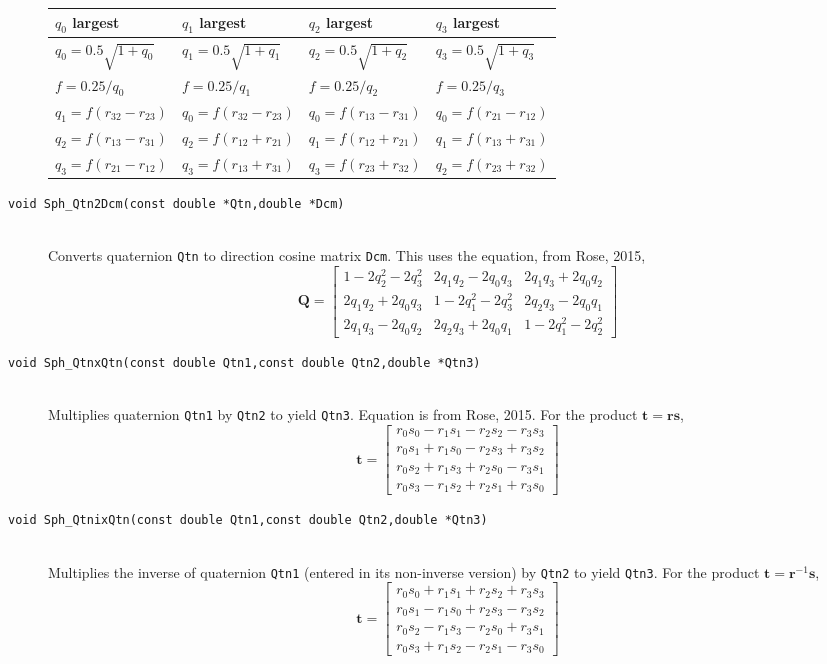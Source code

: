\documentclass[11pt]{article}
\newcommand {\ttt} {\texttt}
\begin{document}
\begin{description}
\begin{tabular}{llll}
$q_0$ largest & $q_1$ largest & $q_2$ largest & $q_3$ largest \\
\hline
$q_0 = 0.5 \sqrt{1+q_0}$ & $q_1 = 0.5 \sqrt{1+q_1}$ & $q_2 = 0.5 \sqrt{1+q_2}$ & $q_3 = 0.5 \sqrt{1+q_3}$ \\
$f = 0.25/q_0$ & $f = 0.25/q_1$ & $f = 0.25/q_2$ & $f = 0.25/q_3$ \\
$q_1=f(r_{32}-r_{23})$ & $q_0=f(r_{32}-r_{23})$ & $q_0=f(r_{13}-r_{31})$ & $q_0=f(r_{21}-r_{12})$ \\
$q_2=f(r_{13}-r_{31})$ & $q_2=f(r_{12}+r_{21})$ & $q_1=f(r_{12}+r_{21})$ & $q_1=f(r_{13}+r_{31})$ \\
$q_3=f(r_{21}-r_{12})$ & $q_3=f(r_{13}+r_{31})$ & $q_3=f(r_{23}+r_{32})$ & $q_2=f(r_{23}+r_{32})$
\end{tabular}


\item[\ttt{void Sph\_Qtn2Dcm(const double *Qtn,double *Dcm)}]
\hfill \\
Converts quaternion \ttt{Qtn} to direction cosine matrix \ttt{Dcm}. This uses the equation, from Rose, 2015,
$$\bm{Q} = \left[ \begin{array}{ccc}
1-2q_2^2-2q_3^2 & 2q_1q_2-2q_0q_3 & 2q_1q_3+2q_0q_2\\
2q_1q_2+2q_0q_3 & 1-2q_1^2-2q_3^2 & 2q_2q_3-2q_0q_1\\
2q_1q_3-2q_0q_2 & 2q_2q_3+2q_0q_1 & 1-2q_1^2-2q_2^2
\end{array} \right]$$


\item[\ttt{void Sph\_QtnxQtn(const double Qtn1,const double Qtn2,double *Qtn3)}]
\hfill \\
Multiplies quaternion \ttt{Qtn1} by \ttt{Qtn2} to yield \ttt{Qtn3}. Equation is from Rose, 2015. For the product $\bm{t}=\bm{r}\bm{s}$,
$$\bm{t}=\left[\begin{array}{c}
r_0s_0 - r_1s_1 - r_2s_2 - r_3s_3 \\
r_0s_1 + r_1s_0 - r_2s_3 + r_3s_2 \\
r_0s_2 + r_1s_3 + r_2s_0 - r_3s_1 \\
r_0s_3 - r_1s_2 + r_2s_1 + r_3s_0
\end{array} \right]$$


\item[\ttt{void Sph\_QtnixQtn(const double Qtn1,const double Qtn2,double *Qtn3)}]
\hfill \\
Multiplies the inverse of quaternion \ttt{Qtn1} (entered in its non-inverse version) by \ttt{Qtn2} to yield \ttt{Qtn3}. For the product $\bm{t}=\bm{r}^{-1}\bm{s}$,
$$\bm{t}=\left[\begin{array}{c}
r_0s_0 + r_1s_1 + r_2s_2 + r_3s_3 \\
r_0s_1 - r_1s_0 + r_2s_3 - r_3s_2 \\
r_0s_2 - r_1s_3 - r_2s_0 + r_3s_1 \\
r_0s_3 + r_1s_2 - r_2s_1 - r_3s_0
\end{array} \right]$$



\end{description}
\end{document}
